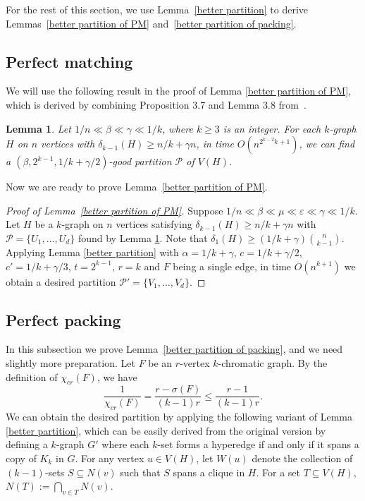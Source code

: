 \documentclass[11pt, letterpaper]{amsart}
\theoremstyle{plain}
\numberwithin{equation}{section}
\newtheorem{lemma}[thm]{Lemma}
\theoremstyle{definition}
\begin{document}
For the rest of this section, we use Lemma~\ref{better partition} to derive Lemmas~\ref{better partition of PM} and~\ref{better partition of packing}.

    \subsection{Perfect matching}

    We will use the following result in the proof of Lemma \ref{better partition of PM}, which is derived by combining Proposition 3.7 and Lemma 3.8 from~\cite{han2017decision}.
    
\begin{lemma}\cite{han2017decision}\label{reachabel set}
        Let $ 1/n\ll \beta\ll\gamma\ll1/k $, where $ k\ge 3 $ is an integer. For each $k$-graph $ H $ on $ n $ vertices with $ \delta_{k-1}(H)\ge n/k+
        \gamma n $, in time $ O(n^{2^{k-2}k+1})$, we can find a $ (\beta,2^{k-1},1/k+\gamma/2)$-good partition $\mathcal{P}$ of \(V(H)\).
    \end{lemma}

Now we are ready to prove Lemma~\ref{better partition of PM}.

\begin{proof}[Proof of Lemma~\ref{better partition of PM}]
Suppose $ 1/n\ll \beta\ll\mu\ll\varepsilon\ll\gamma\ll1/k $. Let $ H $ be a $ k $-graph on $ n $ vertices satisfying $\delta_{k-1}(H)\ge n/k+\gamma n$ with $\mathcal{P}=\{U_1,\dots,U_d\} $ found by Lemma \ref{reachabel set}.
Note that $\delta_{1}(H)\ge (1/k+\gamma) \binom{n}{k-1}$. Applying Lemma \ref{better partition} with $\alpha=1/k+\gamma$, $c=1/k+\gamma/2$, $c'=1/k+\gamma/3$, $t=2^{k-1}$, $r=k$ and $F$ being a single edge, in time $O(n^{k+1})$ we obtain a desired partition $\mathcal{P}'=\{V_1,\dots,V_d\} $.
\end{proof}


\subsection{Perfect packing}

In this subsection we prove Lemma~\ref{better partition of packing}, and we need slightly more preparation. Let $F$ be an $r$-vertex $k$-chromatic graph. 
 By the definition of ${\chi}_{cr}(F)$, we have \[\frac{1}{{\chi}_{cr}(F)}=\frac{r-\sigma(F)}{(k-1)r}\le \frac{r-1}{(k-1)r}.\] 
 We can obtain the desired partition by applying the following variant of Lemma \ref{better partition}, which can be easily derived from the original version by defining a $k$-graph $G'$ where each $k$-set forms a hyperedge if and only if it spans a copy of $K_k$ in $G$. 
 For any vertex $u\in V(H)$, let $W(u)$ denote the collection of $(k-1)$-sets $S\subseteq N(v)$ such that $S$ spans a clique in $H$. 
 For a set $T\subseteq V(H)$, $N(T):=\bigcap _{v\in T}N(v)$.
\end{document}
